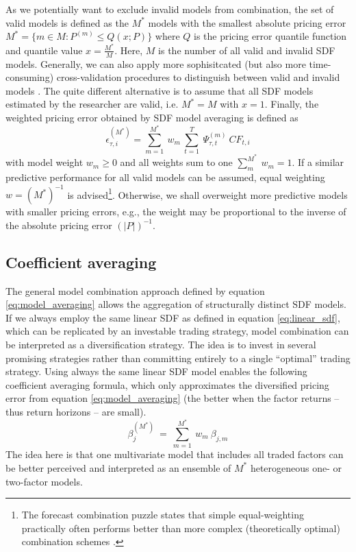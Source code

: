 \documentclass[12pt]{article}
\begin{document}
As we potentially want to exclude invalid models from combination, the set of valid models is defined as the $M^*$ models with the smallest absolute pricing error $M^*=\{m \in M: P^{(m)} \leq Q(x;P) \}$ where $Q$ is the pricing error quantile function and quantile value $x = \frac{M^*}{M}$.
Here, $M$ is the number of all valid and invalid SDF models.
Generally, we can also apply more sophisitcated (but also more time-consuming) cross-validation procedures to distinguish between valid and invalid models \citep{AC10}.
The quite different alternative is to assume that all SDF models estimated by the researcher are valid, i.e. $M^*=M$ with $x=1$.
Finally, the weighted pricing error obtained by SDF model averaging is defined as
\begin{equation}
\label{eq:model_averaging}
\epsilon_{\tau, i}^{(M^*)} = 
\sum_{m=1}^{M^*} \  
w_m \
\sum_{t=1}^{T} \
\Psi_{\tau,t}^{(m)}\ 
{CF}_{t, i}
\end{equation}
with model weight $w_m \geq 0$ and all weights sum to one $\sum_m^{M^*}\ w_m=1$. 
If a similar predictive performance for all valid models can be assumed, equal weighting $w=(M^*)^{-1}$ is advised\footnote{The forecast combination puzzle states that simple equal-weighting practically often performs better than more complex (theoretically optimal) combination schemes \citep{SW09,CMVW16,QRCY19}.}. 
Otherwise, we shall overweight more predictive models with smaller pricing errors, e.g., the weight may be proportional to the inverse of the absolute pricing error $\left(\left|P\right|\right)^{-1}$.

\subsection{Coefficient averaging}
\label{sec:coef_averaging}

The general model combination approach defined by equation \ref{eq:model_averaging} allows the aggregation of structurally distinct SDF models.
If we always employ the same linear SDF as defined in equation \ref{eq:linear_sdf}, which can be replicated by an investable trading strategy, model combination can be interpreted as a diversification strategy.
The idea is to invest in several promising strategies rather than committing entirely to a single ``optimal'' trading strategy.
Using always the same linear SDF model enables the following coefficient averaging formula, which only approximates the diversified pricing error from equation \ref{eq:model_averaging} (the better when the factor returns -- thus return horizons -- are small).
\begin{equation}
\label{eq:coef_averaging}
\beta_j^{(M^*)}\ =\ \sum_{m=1}^{M^*}\ w_m \ \beta_{j,m}
\end{equation}
The idea here is that one multivariate model that includes all traded factors can be better perceived and interpreted as an ensemble of $M^*$ heterogeneous one- or two-factor models.
\end{document}
